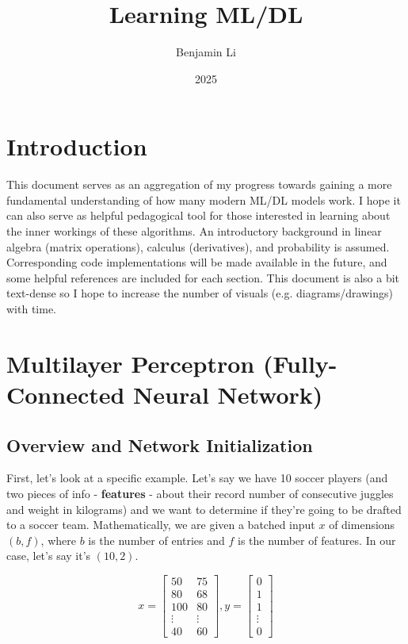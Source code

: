 \documentclass[12pt]{article}
\title{Learning ML/DL}
\author{Benjamin Li}
\date{2025}
\begin{document}
\maketitle

\section{Introduction}

This document serves as an aggregation of my progress towards gaining a more fundamental understanding of how many modern ML/DL models work. I hope it can also serve as helpful pedagogical tool for those interested in learning about the inner workings of these algorithms. An introductory background in linear algebra (matrix operations), calculus (derivatives), and probability is assumed. Corresponding code implementations will be made available in the future, and some helpful references are included for each section. This document is also a bit text-dense so I hope to increase the number of visuals (e.g. diagrams/drawings) with time. 


\section{Multilayer Perceptron (Fully-Connected Neural Network)}
\subsection{Overview and Network Initialization}

First, let's look at a specific example. Let's say we have 10 soccer players (and two pieces of info - \textbf{features} - about their record number of consecutive juggles and weight in kilograms) and we want to determine if they're going to be drafted to a soccer team. Mathematically, we are given a batched input $x$ of dimensions $(b, f)$, where $b$ is the number of entries and $f$ is the number of features. In our case, let’s say it's $(10, 2)$. 

\[x=\begin{bmatrix}
50 & 75 \\
80 & 68 \\
100 & 80 \\
\vdots & \vdots \\
40 & 60
\end{bmatrix}, y=\begin{bmatrix}
0 \\
1 \\
1 \\
\vdots \\
0
\end{bmatrix}\]
\end{document}

